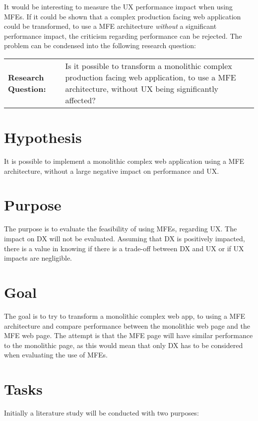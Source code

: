 It would be interesting to measure the \ac{UX} performance impact when using \acp{MFE}. If it could be shown that a complex production facing web application could be transformed, to use a \ac{MFE} architecture \textit{without} a significant performance impact, the criticism regarding performance can be rejected. The problem can be condensed into the following research question:

\begin{center}
\begin{tabular}{p{}p{}}
     \textbf{Research Question:} & Is it possible to transform a monolithic complex production facing web application, to use a \ac{MFE} architecture, without \ac{UX} being significantly affected?
\end{tabular}
\end{center}

\section{Hypothesis}
It is possible to implement a monolithic complex web application using a \ac{MFE} architecture, without a large negative impact on performance and \ac{UX}.

\section{Purpose}
The purpose is to evaluate the feasibility of using \acp{MFE}, regarding \ac{UX}. The impact on \ac{DX} will not be evaluated. Assuming that \ac{DX} is positively impacted, there is a value in knowing if there is a trade-off between \ac{DX} and \ac{UX} or if \ac{UX} impacts are negligible.

\section{Goal}
The goal is to try to transform a monolithic complex web app, to using a \ac{MFE} architecture and compare performance between the monolithic web page and the \ac{MFE} web page. The attempt is that the \ac{MFE} page will have similar performance to the monolithic page, as this would mean that only \ac{DX} has to be considered when evaluating the use of \acp{MFE}.

\section{Tasks}
Initially a literature study will be conducted with two purposes:

